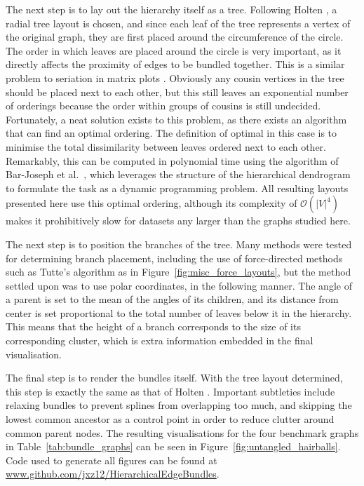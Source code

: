 The next step is to lay out the hierarchy itself as a tree. Following Holten \cite{Holten2006}, a radial tree layout is chosen, and since each leaf of the tree represents a vertex of the original graph, they are first placed around the circumference of the circle. The order in which leaves are placed around the circle is very important, as it directly affects the proximity of edges to be bundled together. This is a similar problem to seriation in matrix plots \cite{Liiv2010}.
Obviously any cousin vertices in the tree should be placed next to each other, but this still leaves an exponential number of orderings because the order within groups of cousins is still undecided.
Fortunately, a neat solution exists to this problem, as there exists an algorithm that can find an optimal ordering. The definition of optimal in this case is to minimise the total dissimilarity between leaves ordered next to each other.
Remarkably, this can be computed in polynomial time using the algorithm of Bar-Joseph et al.\ \cite{Bar-Joseph2001}, which leverages the structure of the hierarchical dendrogram to formulate the task as a dynamic programming problem. All resulting layouts presented here use this optimal ordering, although its complexity of $\mathcal{O}(|V|^4)$ makes it prohibitively slow for datasets any larger than the graphs studied here.

The next step is to position the branches of the tree. Many methods were tested for determining branch placement, including the use of force-directed methods such as Tutte's algorithm as in Figure~\ref{fig:misc_force_layouts}, but the method settled upon was to use polar coordinates, in the following manner.
The angle of a parent is set to the mean of the angles of its children, and its distance from center is set proportional to the total number of leaves below it in the hierarchy. This means that the height of a branch corresponds to the size of its corresponding cluster, which is extra information embedded in the final visualisation.

The final step is to render the bundles itself. With the tree layout determined, this step is exactly the same as that of Holten \cite{Holten2006}. Important subtleties include relaxing bundles to prevent splines from overlapping too much, and skipping the lowest common ancestor as a control point in order to reduce clutter around common parent nodes.
The resulting visualisations for the four benchmark graphs in Table~\ref{tab:bundle_graphs} can be seen in Figure~\ref{fig:untangled_hairballs}.
Code used to generate all figures can be found at \url{www.github.com/jxz12/HierarchicalEdgeBundles}. 

